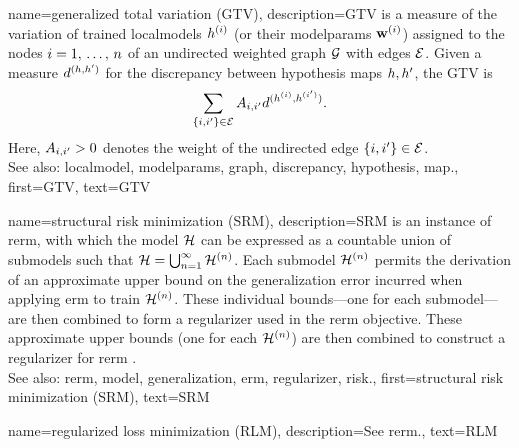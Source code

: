 	
{name={generalized total variation (GTV)}, 
	description={GTV is a 
		measure of the variation of trained \glspl{localmodel} $h^{(i)}$ 
		(or their \gls{modelparams} $\mathbf{w}^{(i)}$) assigned to the nodes $i=1, \,\ldots, \,n$ 
		of an undirected weighted \gls{graph} $\mathcal{G}$ with edges $\mathcal{E}$. Given a measure $d^{(h,h')}$ 
		for the \gls{discrepancy} between \gls{hypothesis} \glspl{map} $h,h'$, the GTV is 
		\begin{equation} 
			\nonumber
			\sum_{\{i,i'\}\in \mathcal{E}} A_{i,i'} 
			d^{(h^{(i)},h^{(i')})}.
		\end{equation}
		Here, $A_{i,i'}>0$ denotes the weight of the undirected edge $\{i,i'\}\in \mathcal{E}$.
				\\
		See also: \gls{localmodel}, \gls{modelparams}, \gls{graph}, \gls{discrepancy}, \gls{hypothesis}, \gls{map}.},
	first={GTV},
	text={GTV} 
}
	
{name={structural risk minimization (SRM)}, 
	description={SRM is an
		instance of \gls{rerm}, with which the \gls{model} $\mathcal{H}$ can be expressed 
		as a countable union of submodels such that $\mathcal{H} = \bigcup_{n=1}^{\infty} \mathcal{H}^{(n)}$. 
		Each submodel $\mathcal{H}^{(n)}$ permits the derivation of an approximate upper bound 
		on the \gls{generalization} error incurred when applying \gls{erm} to train $\mathcal{H}^{(n)}$. 
		These individual bounds—one for each submodel—are then combined to form a \gls{regularizer} 
		used in the \gls{rerm} objective. 
        		These approximate upper bounds (one for each $\mathcal{H}^{(n)}$) are then combined 
		to construct a \gls{regularizer} for \gls{rerm} \cite[Sec.\ 7.2]{ShalevMLBook}.
				\\
		See also: \gls{rerm}, \gls{model}, \gls{generalization}, \gls{erm}, \gls{regularizer}, \gls{risk}.},
	first={structural risk minimization (SRM)},
	text={SRM}
 }

 {name={regularized loss minimization (RLM)},
 	description={See \gls{rerm}.},
 	text={RLM}
 }
 

